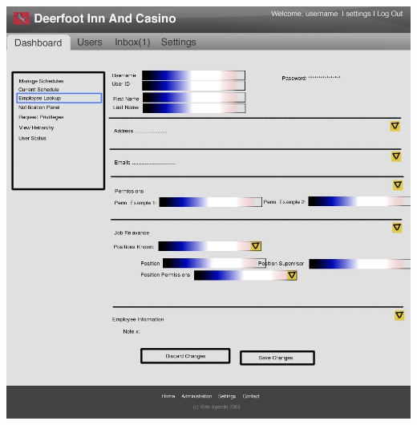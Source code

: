 \documentclass[letterpaper,12pt]{report}
\begin{document}
\begin{landscape}
\newpage
\begin{center}
 \includegraphics[scale=0.3]{prototypes/Screen2.jpg}
\end{center}
\newpage


\end{landscape}
\end{document}
